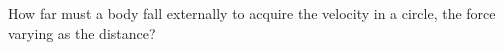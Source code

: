 How far must a body fall externally to acquire 
the velocity in a circle, the force varying as 
the distance?
